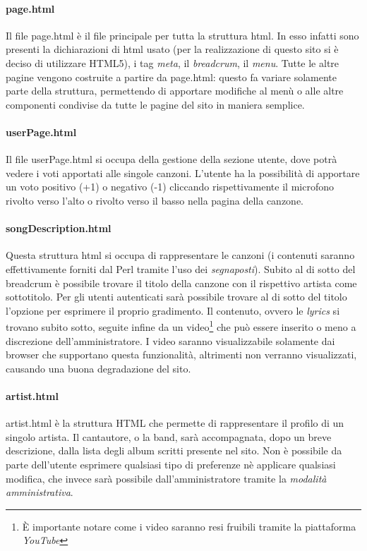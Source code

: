 \paragraph*{page.html} Il file page.html \`e il file principale per tutta la struttura html. In esso infatti sono presenti la dichiarazioni di html usato (per la realizzazione di questo sito si \`e deciso di utilizzare HTML5), i tag \textit{meta}, il \textit{breadcrum}, il \textit{menu}. Tutte le altre pagine vengono costruite a partire da page.html: questo fa variare solamente parte della struttura, permettendo di apportare modifiche al men\`u o alle altre componenti condivise da tutte le pagine del sito in maniera semplice.

\paragraph*{userPage.html} Il file userPage.html si occupa della gestione della sezione utente, dove potrà vedere i voti apportati alle singole canzoni. L'utente ha la possibilità di apportare un voto positivo (+1) o negativo (-1) cliccando rispettivamente il microfono rivolto verso l'alto o rivolto verso il basso nella pagina della canzone.

\paragraph*{songDescription.html} Questa struttura html si occupa di rappresentare le canzoni (i contenuti saranno effettivamente forniti dal Perl tramite l'uso dei \textit{segnaposti}). Subito al di sotto del breadcrum è possibile trovare il titolo della canzone con il rispettivo artista come sottotitolo. Per gli utenti autenticati sarà possibile trovare al di sotto del titolo l'opzione per esprimere il proprio gradimento. Il contenuto, ovvero le \textit{lyrics} si trovano subito sotto, seguite infine da un video\footnote{È importante notare come i video saranno resi fruibili tramite la piattaforma \textit{YouTube}} che può essere inserito o meno a discrezione dell'amministratore. I video saranno visualizzabile solamente dai browser che supportano questa funzionalità, altrimenti non verranno visualizzati, causando una buona degradazione del sito.

\paragraph*{artist.html} artist.html è la struttura HTML che permette di rappresentare il profilo di un singolo artista. Il cantautore, o la band, sarà accompagnata, dopo un breve descrizione, dalla lista degli album scritti presente nel sito. Non è possibile da parte dell'utente esprimere qualsiasi tipo di preferenze nè applicare qualsiasi modifica, che invece sarà possibile dall'amministratore tramite la \textit{modalità amministrativa}.


